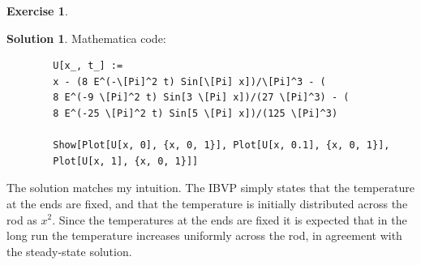 \documentclass{book}
\theoremstyle{definition}
\newtheorem*{exer*}{Exercise}
\newtheorem*{sln*}{Solution}
\begin{document}
\begin{exer*}
\begin{sln*}
		\noindent Mathematica code:
		\begin{lstlisting}
		U[x_, t_] := 
		x - (8 E^(-\[Pi]^2 t) Sin[\[Pi] x])/\[Pi]^3 - (
		8 E^(-9 \[Pi]^2 t) Sin[3 \[Pi] x])/(27 \[Pi]^3) - (
		8 E^(-25 \[Pi]^2 t) Sin[5 \[Pi] x])/(125 \[Pi]^3)
		
		Show[Plot[U[x, 0], {x, 0, 1}], Plot[U[x, 0.1], {x, 0, 1}], 
		Plot[U[x, 1], {x, 0, 1}]]
		\end{lstlisting}
		
		The solution matches my intuition. The IBVP simply states that the temperature at the ends are fixed, and that the temperature is initially distributed across the rod as $x^2$. Since the temperatures at the ends are fixed it is expected that in the long run the temperature increases uniformly across the rod, in agreement with the steady-state solution. 
		
	\end{sln*}
\end{exer*}
\newpage
\end{document}
